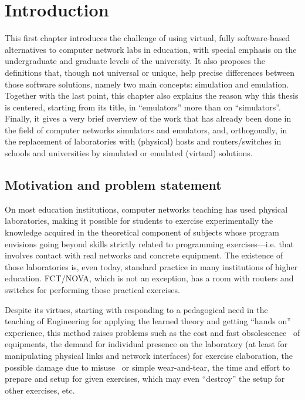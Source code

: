 
\chapter{Introduction}
\label{ch:introduction}

This first chapter introduces the challenge of using virtual, fully software-based alternatives to computer network labs in education, with special emphasis on the undergraduate and graduate levels of the university. %
It also proposes the definitions that, though not universal or unique, help precise differences between those software solutions, namely two main concepts: simulation and emulation. %
Together with the last point, this chapter also explains the reason why this thesis is centered, starting from its title, in ``emulators'' more than on ``simulators''.
Finally, it gives a very brief overview of the work that has already been done in the field of computer networks simulators and emulators, and, orthogonally, in the replacement of laboratories with (physical) hosts and routers/switches in schools and universities by simulated or emulated (virtual) solutions.


\section{Motivation and problem statement}
\label{sec:motivation}

On most education institutions, computer networks teaching has used physical laboratories, making it possible for students to exercise experimentally the knowledge acquired in the theoretical component of subjects whose program envisions going beyond skills strictly related to programming exercises---i.e. that involves contact with real networks and concrete equipment.
The existence of those laboratories is, even today, standard practice in many institutions of higher education. FCT/NOVA, which is not an exception, has a room with routers and switches for performing those practical exercises.

Despite its virtues, starting with responding to a pedagogical need in the teaching of Engineering for applying the learned theory and getting ``hands on'' experience, this method raises problems such as the cost and fast obsolescence~\cite{automaticnetconfiggns} of equipments, the demand for individual presence on the laboratory (at least for manipulating physical links and network interfaces) for exercise elaboration, the possible damage due to misuse~\cite{teachinginovation} or simple wear-and-tear, the time and effort to prepare and setup for given exercises, which may even ``destroy'' the setup for other exercises, etc. %

